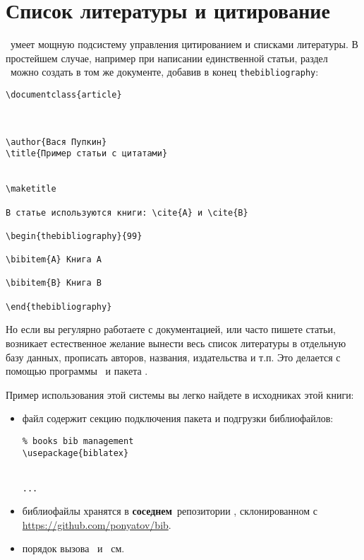 \section{Список литературы и цитирование}

\latex\ умеет мощную подсистему управления цитированием и списками литературы.
В простейшем случае, например при написании единственной статьи, раздел
\ можно создать в том же документе, добавив в конец
\verb|thebibliography|:

\begin{verbatim}
\documentclass{article}



\author{Вася Пупкин}
\title{Пример статьи с цитатами}


\maketitle
	
В статье используются книги: \cite{A} и \cite{B}
	
\begin{thebibliography}{99}

\bibitem{A} Книга А

\bibitem{B} Книга B
	
\end{thebibliography}

\end{verbatim}

Но если вы регулярно работаете с документацией, или часто пишете статьи,
возникает естественное желание вынести весь список литературы в отдельную базу
данных, прописать авторов, названия, издательства и т.п. Это делается с помощью
программы \ и пакета .

Пример использования этой системы вы легко найдете в исходниках этой книги:

\begin{itemize}
  \item файл  содержит секцию подключения пакета и подгрузки
  библиофайлов:
  \begin{verbatim}% books bib management
\usepackage{biblatex}


...\end{verbatim}
  \item библиофайлы хранятся в \textbf{соседнем}\ репозитории ,
  склонированном с \url{https://github.com/ponyatov/bib}.
  \item порядок вызова \ и \ см. 
\end{itemize}
